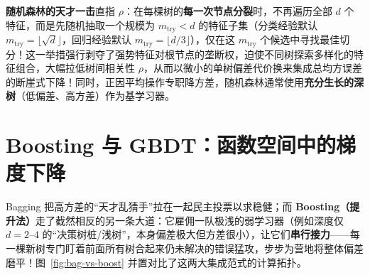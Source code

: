 \textbf{随机森林的天才一击}直指 $\rho$：在每棵树的\textbf{每一次节点分裂}时，不再遍历全部 $d$ 个特征，而是先随机抽取一个规模为 $m_{\text{try}} < d$ 的特征子集（分类经验默认 $m_{\text{try}} = \lfloor \sqrt{d} \rfloor$，回归经验默认 $m_{\text{try}} = \lfloor d/3 \rfloor$），仅在这 $m_{\text{try}}$ 个候选中寻找最佳切分！这一举措强行剥夺了强势特征对根节点的垄断权，迫使不同树探索多样化的特征组合，大幅拉低树间相关性 $\rho$，从而以微小的单树偏差代价换来集成总均方误差的断崖式下降！同时，正因平均操作专职降方差，随机森林通常使用\textbf{充分生长的深树}（低偏差、高方差）作为基学习器。

\section{Boosting 与 GBDT：函数空间中的梯度下降}\label{sec:trees-gbdt}

Bagging 把高方差的“天才乱猜手”拉在一起民主投票以求稳健；而 \textbf{Boosting（提升法）}走了截然相反的另一条大道：它雇佣一队极浅的弱学习器（例如深度仅 $d = 2\text{--}4$ 的“决策树桩/浅树”，本身偏差极大但方差很小），让它们\textbf{串行接力}——每一棵新树专门盯着前面所有树合起来仍未解决的错误猛攻，步步为营地将整体偏差磨平！图~\ref{fig:bag-vs-boost} 并置对比了这两大集成范式的计算拓扑。

